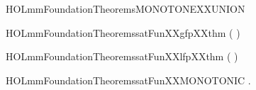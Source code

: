 \newcommand{\HOLmmFoundationTheoremsMONOTONEXXINTER}{\UseVerbatim{HOLmmFoundationTheoremsMONOTONEXXINTER}}
\begin{SaveVerbatim}{HOLmmFoundationTheoremsMONOTONEXXUNION}
\HOLTokenTurnstile{}  \HOLConst{\HOLTokenSubset{}}  \HOLSymConst{\HOLTokenImp{}}  \HOLConst{\HOLTokenSubset{}}  \HOLSymConst{\HOLTokenImp{}}  \HOLConst{\HOLTokenUnion{}}  \HOLConst{\HOLTokenSubset{}}  \HOLConst{\HOLTokenUnion{}} 
\end{SaveVerbatim}
\newcommand{\HOLmmFoundationTheoremsMONOTONEXXUNION}{\UseVerbatim{HOLmmFoundationTheoremsMONOTONEXXUNION}}
\begin{SaveVerbatim}{HOLmmFoundationTheoremssatFunXXgfpXXthm}
\HOLTokenTurnstile{}  (    ) \HOLSymConst{=}
    \HOLTokenLeftbrace{} \HOLTokenBar{}  \HOLConst{\HOLTokenSubset{}}      \HOLTokenRightbrace{}
\end{SaveVerbatim}
\newcommand{\HOLmmFoundationTheoremssatFunXXgfpXXthm}{\UseVerbatim{HOLmmFoundationTheoremssatFunXXgfpXXthm}}
\begin{SaveVerbatim}{HOLmmFoundationTheoremssatFunXXlfpXXthm}
\HOLTokenTurnstile{}  (    ) \HOLSymConst{=}
    \HOLTokenLeftbrace{} \HOLTokenBar{}       \HOLConst{\HOLTokenSubset{}} \HOLTokenRightbrace{}
\end{SaveVerbatim}
\newcommand{\HOLmmFoundationTheoremssatFunXXlfpXXthm}{\UseVerbatim{HOLmmFoundationTheoremssatFunXXlfpXXthm}}
\begin{SaveVerbatim}{HOLmmFoundationTheoremssatFunXXMONOTONIC}
\HOLTokenTurnstile{} \HOLSymConst{\HOLTokenForall{}}     .
      \HOLConst{\HOLTokenSubset{}}  \HOLSymConst{\HOLTokenImp{}}
           \HOLConst{\HOLTokenSubset{}}      
\end{SaveVerbatim}
